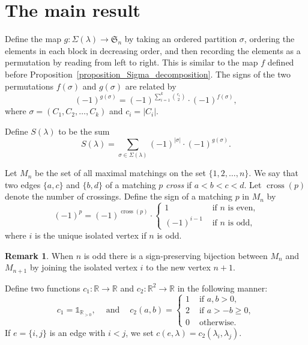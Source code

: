 \documentclass[10pt]{amsart}
\theoremstyle{definition}
\newtheorem{remark}[theorem]{Remark}
\newcommand{\Rrr}{\mathbb{R}}
\newcommand{\Sym}{\mathfrak{S}}
\DeclareMathOperator{\cross}{cross}
\newcommand{\fl}{\rightarrow}
\newcommand{\ungras}{\mathds{1}}
\begin{document}
\section{The main result}
\label{section_main_result}

Define the map
$g : \Sigma(\lambda) \longrightarrow \Sym_{n}$
by taking  an ordered partition $\sigma$,
ordering the elements in each block in decreasing order,
and then
recording the elements as a permutation by reading from left to right.
This is similar to the map $f$ defined before
Proposition~\ref{proposition_Sigma_decomposition}.
The signs of the two permutations $f(\sigma)$ and $g(\sigma)$
are related by
$$
 (-1)^{g(\sigma)} = (-1)^{\sum_{i=1}^{k} \binom{c_{i}}{2}} \cdot (-1)^{f(\sigma)} ,
$$
where $\sigma = (C_{1},C_{2}, \ldots, C_{k})$ and $c_{i} = |C_{i}|$.

Define $S(\lambda)$ to be the sum
\begin{equation}
S(\lambda)
=
\sum_{\sigma \in \Sigma(\lambda)}
(-1)^{|\sigma|} \cdot (-1)^{g(\sigma)} . 
\label{equation_S_lambda}
\end{equation}


Let $M_{n}$ be the set of all
maximal matchings
on the set $\{1,2, \ldots,n\}$.
We say that two edges $\{a,c\}$ and $\{b,d\}$ of a matching $p$
\emph{cross} if $a<b<c<d$. Let $\cross(p)$ denote the number of crossings.
Define the sign of a matching $p$ in $M_{n}$
by
$$   (-1)^{p} = (-1)^{\cross(p)} \cdot
\begin{cases}
1 & \text{ if $n$ is even,} \\
(-1)^{i-1} & \text{ if $n$ is odd,}
\end{cases}
$$
where $i$ is the unique isolated vertex if $n$ is odd.

\begin{remark}
{\rm
When $n$ is odd
there is a sign-preserving bijection
between $M_{n}$ and $M_{n+1}$
by joining the isolated vertex $i$ to the new vertex $n+1$.
}
\label{remark_add_extra_edge}
\end{remark}








Define two functions $c_{1} : \Rrr \fl \Rrr$ and
$c_{2} : \Rrr^{2} \fl \Rrr$ in the following manner:
\[c_{1}=\ungras_{\Rrr_{>0}},
\:\:\:\: \text{ and } \:\:\:\:
c_{2}(a,b)=\left\{\begin{array}{ll}1 & \mbox{ if }a,b>0, \\
2 & \mbox{ if } a > -b \geq 0, \\
0 & \mbox{ otherwise.}\end{array}\right.\]
If $e=\{i,j\}$ is an edge with $i<j$, we set
$c(e,\lambda)=c_{2}(\lambda_{i},\lambda_{j})$.
\end{document}
